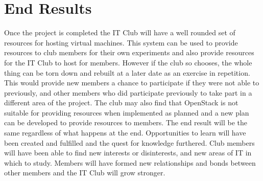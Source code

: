 \documentclass[12pt]{article}
\begin{document}
\section{End Results}
Once the project is completed the IT Club will have a well rounded set of resources for hosting virtual machines. This system can be used
to provide resources to club members for their own experiments and also provide resources for the IT Club to host for members. However if
the club so chooses, the whole thing can be torn down and rebuilt at a later date as an exercise in repetition. This would provide new members
a chance to participate if they were not able to previously, and other members who did participate previously to take part in a different 
area of the project. The club may also find that OpenStack is not suitable for providing resources when implemented as planned and a new plan
can be developed to provide resources to members. The end result will be the same regardless of what happens at the end. Opportunities to learn
will have been created and fulfilled and the quest for knowledge furthered. Club members will have been able to find new interests or disinterests,
and new areas of IT in which to study. Members will have formed new relationships and bonds between other members and the IT Club will grow stronger.
 
\end{document}
